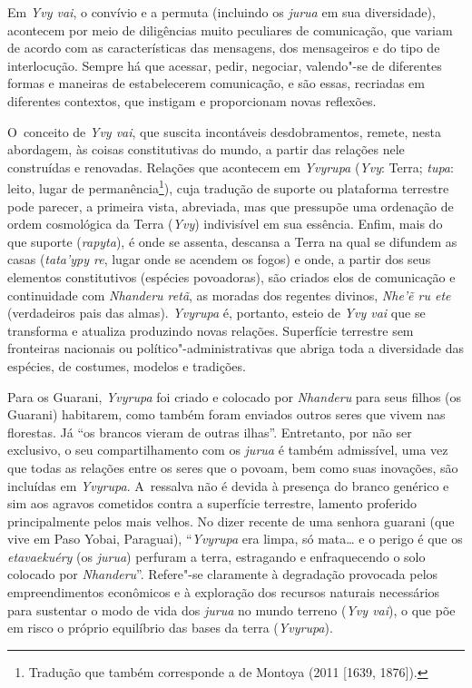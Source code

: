 Em \emph{Yvy vai}, o convívio e a permuta (incluindo os \emph{jurua} em sua
diversidade), acontecem por meio de diligências muito peculiares de
comunicação, que variam de acordo com as características das mensagens,
dos mensageiros e do tipo de interlocução. Sempre há que acessar,
pedir, negociar, valendo"-se de diferentes formas e maneiras de
estabelecerem comunicação, e são essas, recriadas em diferentes
contextos, que instigam e proporcionam novas reflexões. 

O~conceito de \emph{Yvy vai}, que suscita incontáveis desdobramentos, remete,
nesta abordagem, às coisas constitutivas do mundo, a partir das
relações nele construídas e renovadas. Relações que acontecem em
\emph{Yvyrupa} (\emph{Yvy}: Terra; \emph{tupa}: leito, lugar de
permanência\footnote{Tradução que também corresponde a de Montoya (2011
[1639, 1876]). }), cuja tradução de suporte ou plataforma terrestre
pode parecer, a primeira vista, abreviada, mas que pressupõe uma
ordenação de ordem cosmológica da Terra (\emph{Yvy}) indivisível em sua
essência. Enfim, mais do que suporte (\emph{rapyta}), é onde se assenta,
descansa a Terra na qual se difundem as casas (\emph{tata’ypy re}, lugar onde
se acendem os fogos) e onde, a partir dos seus elementos constitutivos
(espécies povoadoras), são criados elos de comunicação e continuidade
com \emph{Nhanderu retã}, as moradas dos regentes divinos, \emph{Nhe’ẽ ru ete}
(verdadeiros pais das almas). \emph{Yvyrupa} é, portanto, esteio de \emph{Yvy vai}
que se transforma e atualiza produzindo novas relações. Superfície
terrestre sem fronteiras nacionais ou político"-administrativas que
abriga toda a diversidade das espécies, de costumes, modelos e
tradições. 

Para os Guarani, \emph{Yvyrupa} foi criado e colocado por \emph{Nhanderu} para seus
filhos (os Guarani) habitarem, como também foram enviados outros seres
que vivem nas florestas. Já ``os brancos vieram de outras ilhas''.
Entretanto, por não ser exclusivo, o seu compartilhamento com os \emph{jurua}
é também admissível, uma vez que todas as relações entre os seres que o
povoam, bem como suas inovações, são incluídas em \emph{Yvyrupa}. A~ressalva
não é devida à presença do branco genérico e sim aos agravos cometidos
contra a superfície terrestre, lamento proferido principalmente pelos
mais velhos. No dizer recente de uma senhora guarani (que vive em Paso
Yobai, Paraguai), ``\emph{Yvyrupa} era limpa, só mata\ldots{} e o perigo é que os
\emph{etavaekuéry} (os \emph{jurua}) perfuram a terra, estragando e enfraquecendo o
solo colocado por \emph{Nhanderu}''. Refere"-se claramente à degradação
provocada pelos empreendimentos econômicos e à exploração dos recursos
naturais necessários para sustentar o modo de vida dos \emph{jurua} no mundo
terreno (\emph{Yvy vai}), o que põe em risco o próprio equilíbrio das bases da
terra (\emph{Yvyrupa}). 

